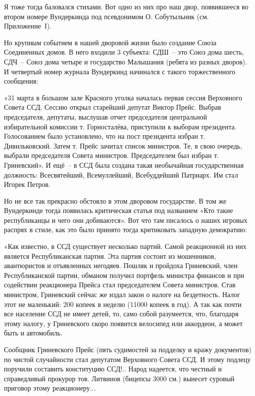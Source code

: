 \indent

Я тоже тогда баловался стихами. Вот одно из них про наш двор, появившееся во втором номере Вундеркинда под псевдонимом О. Собутыльник (см. Приложение~I).

Но крупным событием в нашей дворовой жизни было создание Союза Соединенных домов. В него входили 3 субъекта: СДШ~-- это Союз дома шесть, СДЧ~-- Союз дома четыре и государство Малышания (ребята из разных дворов). И четвертый номер журнала Вундеркинд начинался с такого торжественного сообщения:

«31 марта в большом зале Красного уголка началась первая сессия Верховного Совета ССД. Сессию открыл старейший депутат Виктор Прейс. Выбрав председателя, депутаты, выслушав отчет председателя центральной избирательной комиссии т. Горносталёва, приступили к выборам президента. Голосованием было установлено, что на пост президента избран т. Дивильковский. Затем т. Прейс зачитал список министров. Те, в свою очередь, выбрали председателя Совета министров. Председателем был избран т. Гриневский». И ещё~-- в ССД была создана такая необычайная государственная должность: Всесвятейший, Всемуллейший, Всебуддейший Патриарх. Им стал Игорек Петров.

Но не все так прекрасно обстояло в этом дворовом государстве. В том же Вундеркинде тогда появилась критическая статья под названием «Кто такие республиканцы и чего они добиваются». Вот что там писалось о наших игровых распрях в стиле, как это было принято тогда критиковать западную демократию:

«Как известно, в ССД существует несколько партий. Самой реакционной из них является Республиканская партия. Эта партия состоит из мошенников, авантюристов и отъявленных негодяев. Пошляк и пройдоха Гриневский, член Республиканской партии, обманом получил портфель министра финансов и при содействии реакционера Прейса стал председателем Совета министров. Став министром, Гриневский сейчас же издал закон о налоге на бездетность. Налог этот не маленький: 200 копеек в неделю (11000 копеек в год). А так как почти все население ССД не имеет детей, то, само собой разумеется, что, благодаря этому налогу, у Гриневского скоро появится велосипед или аккордеон, а может быть и автомобиль.

Сообщник Гриневского Прейс (пять судимостей за подделку и кражу документов) по чистой случайности стал депутатом Верховного Совета ССД. И этому подлецу поручили составить конституцию ССД!.. Народ надеется, что честный и справедливый прокурор тов. Литвинов (бицепсы 3000 см.) вынесет суровый приговор этому реакционеру...

